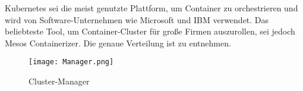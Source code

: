 \newpage
Kubernetes sei die meist genutzte Plattform, um Container zu orchestrieren und wird von Software-Unternehmen wie Microsoft und IBM verwendet. Das beliebteste Tool, um Container-Cluster für große Firmen auszurollen, sei jedoch Mesos Containerizer. \cite{stats}\newline Die genaue Verteilung ist  zu entnehmen.
\begin{figure}[H]
	\begin{center}
		\texttt{[image: Manager.png]}
	\end{center}
	\caption[Cluster-Manager]{Cluster-Manager \footnotemark}
	\label{fig:Stats4}
\end{figure}

